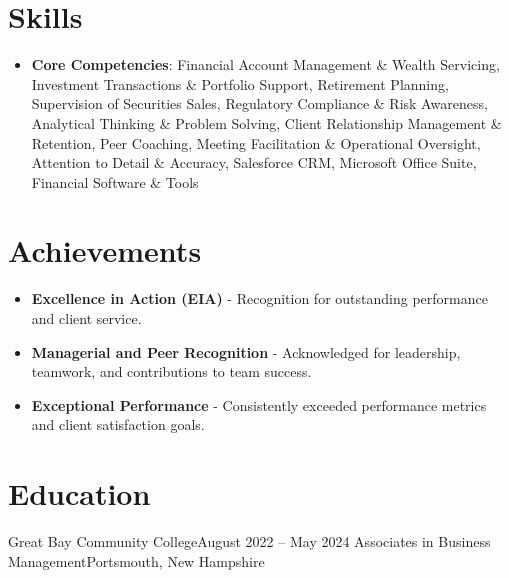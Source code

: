 \documentclass[letterpaper,11pt]{article}
\begin{document}
\section{Skills}
\begin{itemize}[leftmargin=0.15in, label={}]
  \item{\small{
        \textbf{Core Competencies}{: Financial Account Management \&
          Wealth Servicing, Investment Transactions \& Portfolio
          Support, Retirement Planning, Supervision of Securities
          Sales, Regulatory Compliance \& Risk Awareness, Analytical
          Thinking \& Problem Solving, Client Relationship Management
          \& Retention, Peer Coaching, Meeting Facilitation \&
          Operational Oversight, Attention to Detail \& Accuracy,
        Salesforce CRM, Microsoft Office Suite, Financial Software \& Tools}
    }}
\end{itemize}

\section{Achievements}
\begin{itemize}
  \item \small{\textbf{Excellence in Action (EIA)} - Recognition for
    outstanding performance and client service.}
  \item \small{\textbf{Managerial and Peer Recognition} -
    Acknowledged for leadership, teamwork, and contributions to team success.}
  \item \small{\textbf{Exceptional Performance} - Consistently
    exceeded performance metrics and client satisfaction goals.}
\end{itemize}

\section{Education}
\resumeSubHeadingListStart
\resumeSubheading
{Great Bay Community College}{August 2022 -- May 2024}
{Associates in Business Management}{Portsmouth, New Hampshire}
\resumeItemListStart
{}
\resumeItemListEnd
\resumeSubHeadingListEnd
\end{document}
